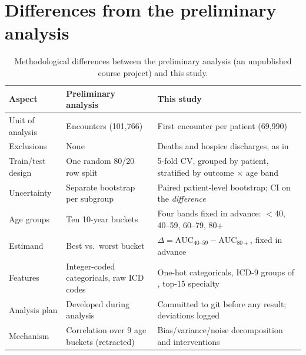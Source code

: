 \documentclass{article}
\begin{document}
\section{Differences from the preliminary analysis}
\label{app:changes}
\begin{table}[H]
\centering\small
\caption{Methodological differences between the preliminary analysis (an unpublished course project) and this study.}
\label{tab:changes}
\begin{tabular}{@{}p{3.1cm}p{5.4cm}p{6.2cm}@{}}
\toprule
Aspect & Preliminary analysis & This study \\
\midrule
Unit of analysis & Encounters (101,766) & First encounter per patient (69,990) \\
Exclusions & None & Deaths and hospice discharges, as in \citet{strack2014} \\
Train/test design & One random 80/20 row split & 5-fold CV, grouped by patient, stratified by outcome $\times$ age band \\
Uncertainty & Separate bootstrap per subgroup & Paired patient-level bootstrap; CI on the \emph{difference} \\
Age groups & Ten 10-year buckets & Four bands fixed in advance: $<$40, 40--59, 60--79, 80+ \\
Estimand & Best vs.\ worst bucket & $\Delta = \mathrm{AUC}_{40\text{--}59} - \mathrm{AUC}_{80+}$, fixed in advance \\
Features & Integer-coded categoricals, raw ICD codes & One-hot categoricals, ICD-9 groups of \citet{strack2014}, top-15 specialty \\
Analysis plan & Developed during analysis & Committed to git before any result; deviations logged \\
Mechanism & Correlation over 9 age buckets (retracted) & Bias/variance/noise decomposition \citep{chen2018} and interventions \\
\bottomrule
\end{tabular}
\end{table}
\end{document}
